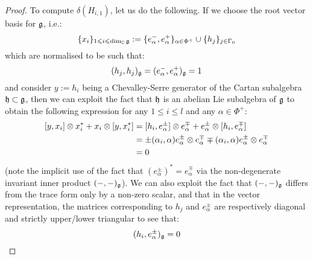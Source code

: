 \begin{proof}
                    To compute $\delta(H_{i, 1})$, let us do the following. If we choose the root vector basis for $\mathfrak{g}$, i.e.:
                        $$\{x_i\}_{1 \leqslant i \leqslant \dim_{\mathbb{C}} \mathfrak{g}} := \{e_{\alpha}^-, e_{\alpha}^+\}_{\alpha \in \Phi^+} \cup \{h_j\}_{j \in \Gamma_0}$$
                    which are normalised to be such that:
                        $$(h_j, h_j)_{\mathfrak{g}} = (e_{\alpha}^-, e_{\alpha}^+)_{\mathfrak{g}} = 1$$
                    and consider $y := h_i$ being a Chevalley-Serre generator of the Cartan subalgebra $\mathfrak{h} \subset \mathfrak{g}$, then we can exploit the fact that $\mathfrak{h}$ is an abelian Lie subalgebra of $\mathfrak{g}$ to obtain the following expression for any $1 \leq i \leq l$ and any $\alpha \in \Phi^+$:
                        $$
                            \begin{aligned}
                                [y, x_i] \tensor x_i^* + x_i \tensor [y, x_i^*] & = [h_i, e_{\alpha}^{\pm}] \tensor e_{\alpha}^{\mp} + e_{\alpha}^{\pm} \tensor [h_i, e_{\alpha}^{\mp}]
                                \\
                                & = \pm (\alpha_i, \alpha) e_{\alpha}^{\pm} \tensor e_{\alpha}^{\mp} \mp (\alpha_i, \alpha) e_{\alpha}^{\pm} \tensor e_{\alpha}^{\mp}
                                \\
                                & = 0
                            \end{aligned}
                        $$
                    (note the implicit use of the fact that $(e_{\alpha}^{\pm})^* = e_{\alpha}^{\mp}$ via the non-degenerate invariant inner product $(-, -)_{\mathfrak{g}}$). We can also exploit the fact that $(-, -)_{\mathfrak{g}}$ differs from the trace form only by a non-zero scalar, and that in the vector representation, the matrices corresponding to $h_j$ and $e_{\alpha}^{\pm}$ are respectively diagonal and strictly upper/lower triangular to see that:
                        $$(h_i, e_{\alpha}^{\pm})_{\mathfrak{g}} = 0$$


\end{proof}
